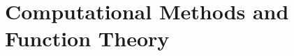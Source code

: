 \section{Computational Methods and Function Theory}

 \def\lab#1{\label{#1}}

\def\CA{{\mathcal A }}
\def\CAO{{\mathcal A}_0}
\def\CW{{\mathcal W }}
\def\CH{{\mathcal H }}
\def\CP{{\mathcal P }}
\def\CK{{\mathcal K }}
\def\CF{{\mathcal F }}
\def\CS{{\mathcal S }}
\def\CC{{\mathcal C }}
\def\CQ{{\mathcal Q }}
\def\CW{{\mathcal W}}
\def\CV{{\mathcal V}}
\def\CPn{{\mathcal P}_n}
\def\CR{{\mathcal R}}
\def\CT{{\mathcal T}}
\def\CV{{\mathcal V}}
\def\WO{{\mathcal W}_{\Omega }}

\def\N{{\mathbb N }}
\def\NO{{\mathbb N }_0}
\def\Z{{\mathbb Z }}
\def\Q{{\mathbb Q }}
\def\R{{\mathbb R }}
\def\C{{\mathbb C }}
\def\F{{\mathbb F }} %
\def\K{{\mathbb K }}
\def\U{{\mathbb U }}
\def\D{{\mathbb D }}
\def\B{{\mathbb B }}
\def\T{{\mathbb T }}



\def\proof{\noindent{\bf Proof.\ \ }}
\def\phi{\varphi}
\def\epsilon{\varepsilon}
\def\RE{\mbox{\rm Re}\,}
\def\IM{\mbox{\rm Im}\,}
\def\AZ{|z|}
\def\COG{\CC_{\Omega{_\gamma}}}
\def\COOG{\CC(\Omega_\gamma)}
\def\CU{\CC_u}
\def\CUU{\CC_u'}
\def\CHL{\CH(\Lambda)}
\def\CHO{\CH(\Omega_\gamma^*)}

\def\F{{}_2F_1}
\def\Hyp{{}_2F_1}
\def\HY{{}_2F_1}

\def\H{{\mathcal H}(\D)}
\def\Hb{{\mathcal H}(\DB)}
\def\HO{{\mathcal H}_0(\D )}
\def\Hoo#1{{\mathcal H}(\overline{\D_{#1}})}
\def\HB#1{{\mathcal H}(\D_{#1})}
\def\Ho#1{{\mathcal H}({#1})}
\def\d#1{\D_{#1}}
\def\DB{\overline{\D}}
\def\Db#1{\overline{\D_{#1}}}
\def\DBR{\overline{\D_\rho}}

\def\DV{de la Vall\'ee Poussin }

\def\zz{\overline{z}}




\def\A{{\mathcal A }}
\def\CW{{\mathcal W }}
\def\CH{{\mathcal H }}
\def\CHN{\CH'}
\def\CP{{\mathcal P }}
\def\CS{{\mathcal S }}
\def\Li{{\mbox{\rm Li}}}

